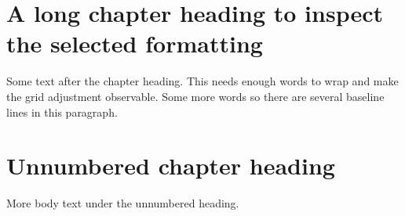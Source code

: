\documentclass[12pt]{report}
\begin{document}
\chapter{A long chapter heading to inspect the selected formatting}
Some text after the chapter heading. This needs enough words to wrap and make the grid adjustment observable. Some more words so there are several baseline lines in this paragraph.
\chapter*{Unnumbered chapter heading}
More body text under the unnumbered heading.
\end{document}
